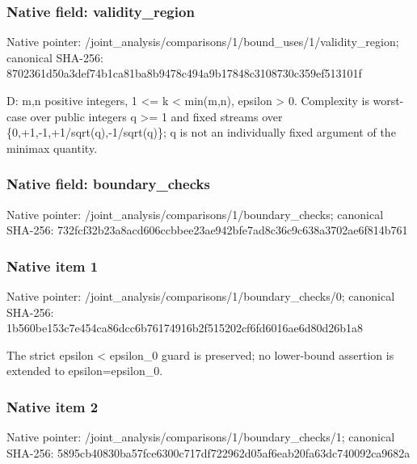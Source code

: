 \documentclass[10pt,a4paper]{article}
\begin{document}
\subsubsection{Native field: validity\_\allowbreak{}region}
Native pointer: /joint\_\allowbreak{}analysis/comparisons/1/bound\_\allowbreak{}uses/1/validity\_\allowbreak{}region; canonical SHA-256: 8702361d50a3def74b1ca81ba8b9478c494a9b17848c3108730c359ef513101f

\begingroup\raggedright\sloppy D:\allowbreak{} m,\allowbreak{}n positive integers,\allowbreak{} 1 <=\allowbreak{} k < min(m,\allowbreak{}n),\allowbreak{} epsilon > 0. Complexity is worst-case over public integers q >=\allowbreak{} 1 and fixed streams over \{0,\allowbreak{}+1,\allowbreak{}-1,\allowbreak{}+1/\allowbreak{}sqrt(q),\allowbreak{}-1/\allowbreak{}sqrt(q)\};\allowbreak{} q is not an individually fixed argument of the minimax quantity.\par\endgroup

\subsubsection{Native field: boundary\_\allowbreak{}checks}
Native pointer: /joint\_\allowbreak{}analysis/comparisons/1/boundary\_\allowbreak{}checks; canonical SHA-256: 732fcf32b23a8acd606ccbbee23ae942bfe7ad8c36c9c638a3702ae6f814b761

\subsubsection{Native item 1}
Native pointer: /joint\_\allowbreak{}analysis/comparisons/1/boundary\_\allowbreak{}checks/0; canonical SHA-256: 1b560be153c7e454ca86dcc6b76174916b2f515202cf6fd6016ae6d80d26b1a8

\begingroup\raggedright\sloppy The strict epsilon < epsilon\_\allowbreak{}0 guard is preserved;\allowbreak{} no lower-bound assertion is extended to epsilon=\allowbreak{}epsilon\_\allowbreak{}0.\par\endgroup

\subsubsection{Native item 2}
Native pointer: /joint\_\allowbreak{}analysis/comparisons/1/boundary\_\allowbreak{}checks/1; canonical SHA-256: 5895cb40830ba57fce6300c717df722962d05af6eab20fa63dc740092ca9682a
\end{document}
